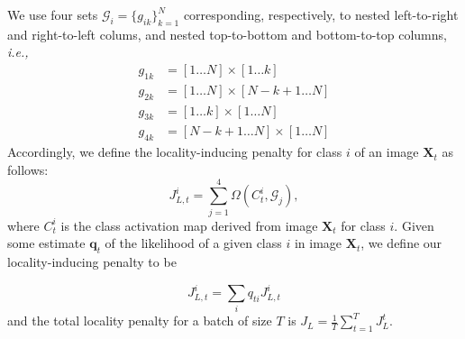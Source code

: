 \documentclass[runningheads]{llncs}
\begin{document}


We use four sets $\mathcal G_i = \{g_{ik}\}_{k=1}^N$ corresponding, respectively, to nested left-to-right and right-to-left colums, and nested top-to-bottom and bottom-to-top columns, \textit{i.e.,}
\begin{align}
  g_{1k} & = [1 \ldots N] \times [1 \ldots k] \\
  g_{2k} & = [1 \ldots N] \times [N-k+1 \ldots N] \\
  g_{3k} & = [1 \ldots k] \times [1 \ldots N] \\
  g_{4k} & = [N-k+1 \ldots N] \times [1 \ldots N]
\end{align}
Accordingly, we define the locality-inducing penalty for class $i$ of an image $\mathbf{X}_t$ as follows:
\begin{equation} \label{eq:JLt}
	J_{L,t}^{i} = \sum_{j=1}^{4}\Omega(C^i_t, \mathcal G_j),
\end{equation}
where $C^i_{t}$ is the class activation map derived from image $\mathbf X_t$ for class $i$. Given some estimate $\mathbf q_{t}$ of the likelihood of a given class $i$ in image $\mathbf X_t$, we define our locality-inducing penalty to be

\begin{equation}
  J_{L,t}^i = \sum_{i} q_{ti} J_{L,t}^i
\end{equation}
and the total locality penalty for a batch of size $T$ is $J_L = \frac{1}{T} \sum_{t=1}^{T} J_L^t$.\\
\end{document}
